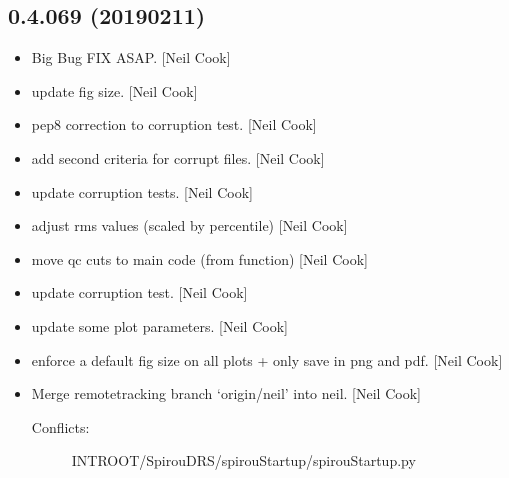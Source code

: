 \documentclass[a4paper,10pt,english]{report}
\begin{document}
\subsection{0.4.069 (2019\sphinxhyphen{}02\sphinxhyphen{}11)}
\label{\detokenize{misc/changelog:id208}}\begin{itemize}
\item {} 
 \sphinxhyphen{} Big Bug FIX ASAP. {[}Neil Cook{]}

\item {} 
 \sphinxhyphen{} update  fig size. {[}Neil
Cook{]}

\item {} 
 \sphinxhyphen{} pep8 correction to corruption test. {[}Neil Cook{]}

\item {} 
 \sphinxhyphen{} add second criteria for corrupt files.
{[}Neil Cook{]}

\item {} 
 \sphinxhyphen{} update corruption tests. {[}Neil Cook{]}

\item {} 
 \sphinxhyphen{} adjust rms values (scaled by percentile) {[}Neil Cook{]}

\item {} 
 \sphinxhyphen{} move qc cuts to main code (from function)
{[}Neil Cook{]}

\item {} 
 \sphinxhyphen{} update corruption test. {[}Neil Cook{]}

\item {} 
 \sphinxhyphen{} update some plot parameters. {[}Neil Cook{]}

\item {} 
 \sphinxhyphen{} enforce a default fig size on all plots + only save in
png and pdf. {[}Neil Cook{]}

\item {} 
Merge remote\sphinxhyphen{}tracking branch ‘origin/neil’ into neil. {[}Neil Cook{]}
\begin{description}
\item[{Conflicts:}] \leavevmode
INTROOT/SpirouDRS/spirouStartup/spirouStartup.py


\end{description}
\end{itemize}
\end{document}
